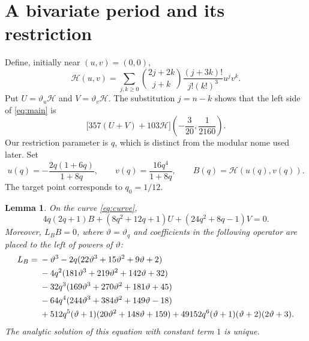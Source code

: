 \documentclass[11pt,a4paper]{article}
\newtheorem{lemma}[theorem]{Lemma}
\theoremstyle{remark}
\newcommand{\tht}{\vartheta}
\newcommand{\HH}{\mathcal H}
\begin{document}
\section{A bivariate period and its restriction}
Define, initially near $(u,v)=(0,0)$,
\begin{equation}\label{eq:H}
 \HH(u,v)=\sum_{j,k\geq0}
 \binom{2j+2k}{j+k}\frac{(j+3k)!}{j!(k!)^3}u^jv^k.
\end{equation}
Put $U=\tht_u\HH$ and $V=\tht_v\HH$. The substitution $j=n-k$
shows that the left side of \eqref{eq:main} is
\begin{equation}\label{eq:targetH}
 \bigl[357(U+V)+103\HH\bigr]
             \left(-\frac3{20},\frac1{2160}\right).
\end{equation}
Our restriction parameter is $q$, which is distinct from the modular
nome used later. Set
\begin{equation}\label{eq:curve}
 u(q)=-\frac{2q(1+6q)}{1+8q},\qquad
 v(q)=\frac{16q^4}{1+8q},\qquad B(q)=\HH(u(q),v(q)).
\end{equation}
The target point corresponds to $q_0=1/12$.

\begin{lemma}\label{lem:restriction}
On the curve \eqref{eq:curve},
\begin{equation}\label{eq:gradient}
 4q(2q+1)B+(8q^2+12q+1)U+(24q^2+8q-1)V=0.
\end{equation}
Moreover, $L_BB=0$, where $\tht=\tht_q$ and coefficients in the following
operator are placed to the left of powers of $\tht$:
\begin{align}\label{eq:LB}
L_B={}&-\tht^3
 -2q(22\tht^3+15\tht^2+9\tht+2)\notag\\
 &-4q^2(181\tht^3+219\tht^2+142\tht+32)\notag\\
 &-32q^3(169\tht^3+270\tht^2+181\tht+45)\notag\\
 &-64q^4(244\tht^3+384\tht^2+149\tht-18)\notag\\
 &+512q^5(\tht+1)(20\tht^2+148\tht+159)
 +49152q^6(\tht+1)(\tht+2)(2\tht+3).
\end{align}
The analytic solution of this equation with constant term $1$ is unique.
\end{lemma}
\end{document}
